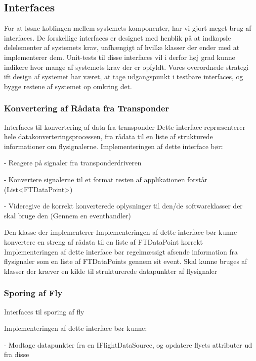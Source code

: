 \subsection{Interfaces}
For at løsne koblingen mellem systemets komponenter, har vi gjort meget brug af interfaces. 
De forskellige interfaces er designet med henblik på at indkapsle delelementer af systemets krav, uafhængigt af hvilke klasser der ender med at implementerer dem.
Unit-tests til disse interfaces vil i derfor høj grad kunne indikere hvor mange af systemets krav der er opfyldt. Vores overordnede strategi ift design af systemet har været, at tage udgangspunkt i testbare interfaces, og bygge restene af systemet op omkring det.
\subsubsection{Konvertering af Rådata fra Transponder}
{Interfaces til konvertering af data fra transponder}
Dette interface repræsenterer hele datakonverteringsprocessen, fra rådata til en liste af strukturede informationer om flysignalerne.
Implementeringen af dette interface bør:

- Reagere på signaler fra transponderdriveren

- Konvertere signalerne til et format resten af applikationen forstår (List<FTDataPoint>)

- Videregive de korrekt konverterede oplysninger til den/de softwareklasser der skal bruge den (Gennem en eventhandler)

Den klasse der implementerer
Implementeringen af dette interface bør kunne konvertere en streng af rådata til en liste af FTDataPoint korrekt
Implementeringen af dette interface bør regelmæssigt afsende information fra flysignaler som en liste af FTDataPoints gennem sit event. Skal kunne bruges af klasser der kræver en kilde til strukturerede datapunkter af flysignaler
\subsubsection{Sporing af Fly}

{Interfaces til sporing af fly}

Implementeringen af dette interface bør kunne:

- Modtage datapunkter fra en IFlightDataSource, og opdatere flyets attributer ud fra disse

